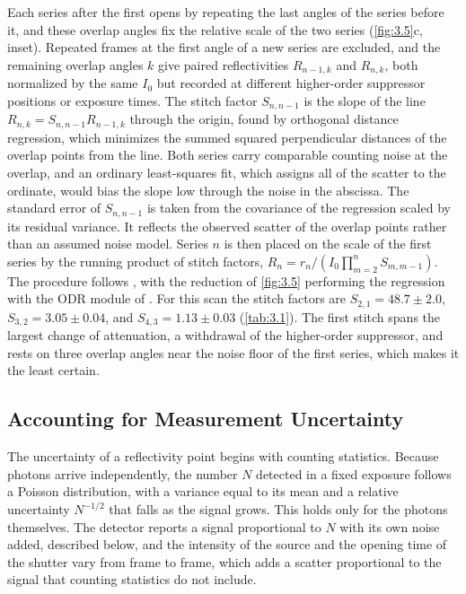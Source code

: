 Each series after the first opens by repeating the last angles of the series before it, and these overlap angles fix the relative scale of the two series (\cref{fig:3.5}c, inset). Repeated frames at the first angle of a new series are excluded, and the remaining overlap angles \(k\) give paired reflectivities \(R_{n - 1,k}\) and \(R_{n,k}\), both normalized by the same \(I_{0}\) but recorded at different higher-order suppressor positions or exposure times. The stitch factor \(S_{n,n - 1}\) is the slope of the line \(R_{n,k} = S_{n,n - 1}R_{n - 1,k}\) through the origin, found by orthogonal distance regression,\autocite{boggsOrthogonalDistanceRegression1990} which minimizes the summed squared perpendicular distances of the overlap points from the line. Both series carry comparable counting noise at the overlap, and an ordinary least-squares fit, which assigns all of the scatter to the ordinate, would bias the slope low through the noise in the abscissa. The standard error of \(S_{n,n - 1}\) is taken from the covariance of the regression scaled by its residual variance. It reflects the observed scatter of the overlap points rather than an assumed noise model. Series \(n\) is then placed on the scale of the first series by the running product of stitch factors, \(R_{n} = r_{n}/\left( I_{0}\prod_{m = 2}^{n}S_{m,m - 1} \right)\). The procedure follows , with the reduction of \cref{fig:3.5} performing the regression with the ODR module of .\autocite{virtanenSciPy10Fundamental2020,ALSRSOXSPxrreduce2026} For this scan the stitch factors are \(S_{2,1} = 48.7 \pm 2.0\), \(S_{3,2} = 3.05 \pm 0.04\), and \(S_{4,3} = 1.13 \pm 0.03\) (\cref{tab:3.1}). The first stitch spans the largest change of attenuation, a withdrawal of the higher-order suppressor, and rests on three overlap angles near the noise floor of the first series, which makes it the least certain.

\subsection{Accounting for Measurement Uncertainty}\label{sec:accounting-for-measurement-uncertainty}

The uncertainty of a reflectivity point begins with counting statistics. Because photons arrive independently, the number \(N\) detected in a fixed exposure follows a Poisson distribution, with a variance equal to its mean and a relative uncertainty \(N^{- 1/2}\) that falls as the signal grows. This holds only for the photons themselves. The detector reports a signal proportional to \(N\) with its own noise added, described below, and the intensity of the source and the opening time of the shutter vary from frame to frame, which adds a scatter proportional to the signal that counting statistics do not include.

